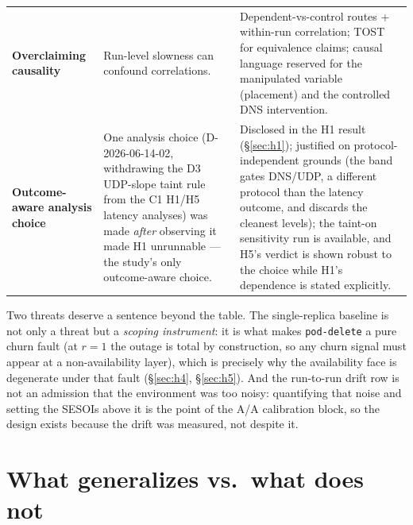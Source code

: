 \begin{center}
\begin{tabular}{p{}p{}p{}}
\addlinespace
\textbf{Overclaiming causality} & Run-level slowness can confound correlations. & Dependent-vs-control routes + within-run correlation; TOST for equivalence claims; causal language reserved for the manipulated variable (placement) and the controlled DNS intervention. \\
\addlinespace
\textbf{Outcome-aware analysis choice} & One analysis choice (D-2026-06-14-02, withdrawing the D3 UDP-slope taint rule from the C1 H1/H5 latency analyses) was made \emph{after} observing it made H1 unrunnable --- the study's only outcome-aware choice. & Disclosed in the H1 result (\S\ref{sec:h1}); justified on protocol-independent grounds (the band gates DNS/UDP, a different protocol than the latency outcome, and discards the cleanest levels); the taint-on sensitivity run is available, and H5's verdict is shown robust to the choice while H1's dependence is stated explicitly. \\
\bottomrule
\end{tabular}
\end{center}

Two threats deserve a sentence beyond the table. The single-replica baseline is
not only a threat but a \emph{scoping instrument}: it is what makes
\texttt{pod-delete} a pure churn fault (at $r{=}1$ the outage is total by
construction, so any churn signal must appear at a non-availability layer),
which is precisely why the availability face is degenerate under that fault
(\S\ref{sec:h4}, \S\ref{sec:h5}). And the run-to-run drift row is not an
admission that the environment was too noisy: quantifying that noise and setting
the SESOIs above it is the point of the A/A calibration block, so the design
exists because the drift was measured, not despite it.

\section{What generalizes vs.\ what does not}\label{sec:generalizes}

